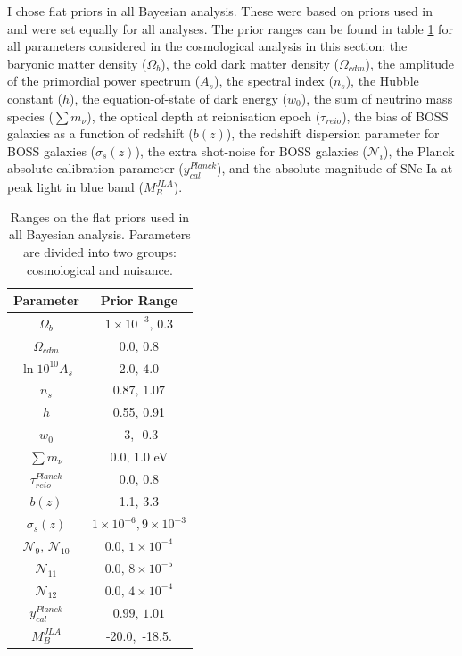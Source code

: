 \qquad I chose flat priors in all Bayesian analysis. These were based on priors used in \cite{JLAdata,2016BOSSCosmology,PlanckCosmology2016,2017arXiv170801530D} and were set equally for all analyses. The prior ranges can be found in table \ref{Tb:Priors} for all parameters considered in the cosmological analysis in this section: the baryonic matter density ($\Omega_b$), the cold dark matter density ($\Omega_{cdm}$), the amplitude of the primordial power spectrum ($A_s$), the spectral index ($n_s$), the Hubble constant ($h$), the equation-of-state of dark energy ($w_0$), the sum of neutrino mass species ($\sum m_{\nu}$), the optical depth at reionisation epoch ($\tau_{reio}$), the bias of BOSS galaxies as a function of redshift ($b(z)$), the redshift dispersion parameter for BOSS galaxies ($\sigma_s(z)$), the extra shot-noise for BOSS galaxies ($\mathcal{N}_i$), the Planck absolute calibration parameter ($y_{cal}^{Planck}$), and the absolute magnitude of SNe Ia at peak light in blue band ($M_B^{JLA}$).

\begin{table}
  \centering
  \caption[Prior ranges used in the BOSS analysis.]{Ranges on the flat priors used in all Bayesian analysis. Parameters are divided into two groups: cosmological and nuisance.}
  \label{Tb:Priors}
  \begin{tabular}{cc}
    \hline
    \hline
    Parameter & Prior Range \\
    \hline
        \hline
     $\Omega_b$ & $1 \times 10^{-3}, \, 0.3$    \\
     $\Omega_{cdm}$ & $0.0, \, 0.8$    \\[0.1cm]
     $\ln 10^{10} A_s$ & $2.0, \, 4.0$    \\
     $n_s$ & $0.87, \, 1.07$    \\
     $h$ & 0.55, 0.91 \\
     $w_0$ & -3, -0.3\\
     $\sum m_{\nu}$ & 0.0, 1.0 eV\\[0.1cm]
     $\tau^{Planck}_{reio}$  & 0.0, 0.8 \\
     \hline
     $b(z)$  & 1.1, 3.3 \\
     $\sigma_s(z)$ & $1 \times 10^{-6}, 9 \times 10^{-3}$ \\
     $\mathcal{N}_{9}, \, \mathcal{N}_{10}$ & $0.0, \, 1\times 10^{-4}$ \\
     $\mathcal{N}_{11}$ & $0.0, \, 8\times 10^{-5}$ \\
     $\mathcal{N}_{12}$ & $0.0, \, 4\times 10^{-4}$ \\
     $y_{cal}^{Planck}$ & $0.99, \, 1.01$ \\
     $M_B^{JLA}$ & -20.0,\, -18.5.\\
     \hline
        \hline
  \end{tabular}
\end{table}

